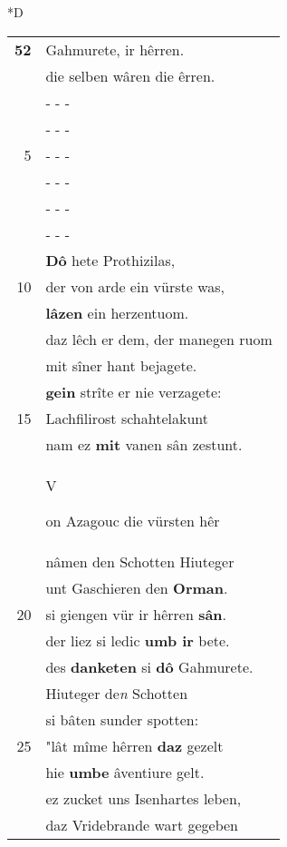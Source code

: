 \documentclass[8pt,a4paper,notitlepage]{article}
\begin{document}
\begin{table}[ht]
\begin{minipage}[t]{0.5\linewidth}
\small
\begin{center}*D
\end{center}
\begin{tabular}{rl}
\textbf{52} & Gahmurete, ir hêrren.\\ 
 & die selben wâren die êrren.\\ 
 & \multicolumn{1}{l}{ - - - }\\ 
 & \multicolumn{1}{l}{ - - - }\\ 
5 & \multicolumn{1}{l}{ - - - }\\ 
 & \multicolumn{1}{l}{ - - - }\\ 
 & \multicolumn{1}{l}{ - - - }\\ 
 & \multicolumn{1}{l}{ - - - }\\ 
 & \textbf{Dô} hete Prothizilas,\\ 
10 & der von arde ein vürste was,\\ 
 & \textbf{lâzen} ein herzentuom.\\ 
 & daz lêch er dem, der manegen ruom\\ 
 & mit sîner hant bejagete.\\ 
 & \textbf{gein} strîte er nie verzagete:\\ 
15 & Lachfilirost schahtelakunt\\ 
 & nam ez \textbf{mit} vanen sân zestunt.\\ 
 & \begin{large}V\end{large}on Azagouc die vürsten hêr\\ 
 & nâmen den Schotten Hiuteger\\ 
 & unt Gaschieren den \textbf{Orman}.\\ 
20 & si giengen vür ir hêrren \textbf{sân}.\\ 
 & der liez si ledic \textbf{umb ir} bete.\\ 
 & des \textbf{danketen} si \textbf{dô} Gahmurete.\\ 
 & Hiuteger de\textit{n} Schotten\\ 
 & si bâten sunder spotten:\\ 
25 & "lât mîme hêrren \textbf{daz} gezelt\\ 
 & hie \textbf{umbe} âventiure gelt.\\ 
 & ez zucket uns Isenhartes leben,\\ 
 & daz Vridebrande wart gegeben\\ 

\end{tabular}
\end{minipage}
\end{table}
\end{document}
